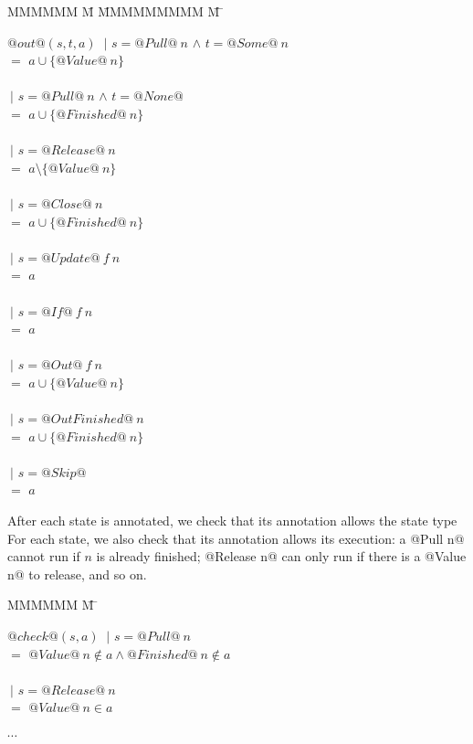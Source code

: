 \begin{tabbing}
MMMMMM \= M \= MMMMMMMMM \= M \= \kill

$@out@(s, t, a)$
 \> $~|$ \> $s = @Pull@~n $ \> $ \wedge$ \> $t = @Some@~n$ \\
 \> $=$  \> $ a \cup \{@Value@~n\} $ \\
\\
 \> $~|$ \> $s = @Pull@~n $ \> $ \wedge$ \> $t = @None@$ \\
 \> $=$  \> $ a \cup \{@Finished@~n\} $ \\
\\
 \> $~|$ \> $s = @Release@~n $ \\
 \> $=$  \> $ a \setminus \{@Value@~n\} $ \\
\\
 \> $~|$ \> $s = @Close@~n $ \\
 \> $=$  \> $ a \cup \{@Finished@~n\} $ \\
\\
 \> $~|$ \> $s = @Update@~f~n $ \\
 \> $=$  \> $ a $ \\
\\
 \> $~|$ \> $s = @If@~f~n $ \\
 \> $=$  \> $ a $ \\
\\
 \> $~|$ \> $s = @Out@~f~n $ \\
 \> $=$  \> $ a \cup \{@Value@~n\} $ \\
\\
 \> $~|$ \> $s = @OutFinished@~n $ \\
 \> $=$  \> $ a \cup \{@Finished@~n\} $ \\
\\
 \> $~|$ \> $s = @Skip@ $ \\
 \> $=$  \> $ a $ \\
\end{tabbing}

After each state is annotated, we check that its annotation allows the state type 
For each state, we also check that its annotation allows its execution: a @Pull n@ cannot run if $n$ is already finished; @Release n@ can only run if there is a @Value n@ to release, and so on.

\begin{tabbing}
MMMMMM \= M \= \kill

$@check@(s, a)$
 \> $~|$ \> $s = @Pull@~n$ \\
 \> $=$  \> $ @Value@~n \not\in a \wedge @Finished@~n \not\in a $ \\
\\
 \> $~|$ \> $s = @Release@~n$ \\
 \> $=$  \> $ @Value@~n \in a$ \\
\\
 \>      \> $\cdots$
\end{tabbing}


